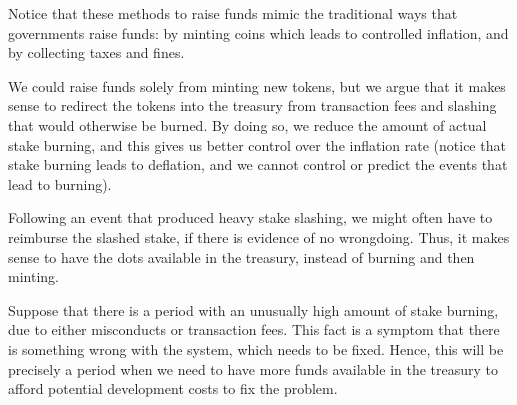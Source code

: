 Notice that these methods to raise funds mimic the traditional ways that governments raise funds: by minting coins which leads to controlled inflation, and by collecting taxes and fines.

We could raise funds solely from minting new tokens, but we argue that it makes sense to redirect the tokens into the treasury from transaction fees and slashing that would otherwise be burned.
By doing so, we reduce the amount of actual stake burning, and this gives us better control over the inflation rate (notice that stake burning leads to deflation, and we cannot control or predict the events that lead to burning).

Following an event that produced heavy stake slashing, we might often have to reimburse the slashed stake, if there is evidence of no wrongdoing. Thus, it makes sense to have the dots available in the treasury, instead of burning and then minting.

Suppose that there is a period with an unusually high amount of stake burning, due to either misconducts or transaction fees. This fact is a symptom that there is something wrong with the system, which needs to be fixed. Hence, this will be precisely a period when we need to have more funds available in the treasury to afford potential development costs to fix the problem.


